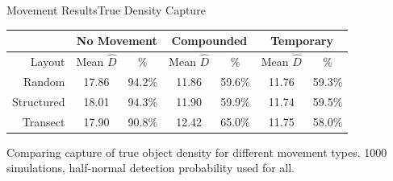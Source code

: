 \documentclass{beamer}
\begin{document}
\begin{frame}{Movement Results}{True Density Capture}

	\begin{table}
	
		\begin{tabular}{ r| c c| c c| c c|}
		
			& \multicolumn{2}{|c|}{No Movement}	& \multicolumn{2}{|c|}{Compounded}	& \multicolumn{2}{|c|}{Temporary}\\ 
	 \hline \hline
	
	 Layout		&\footnotesize Mean $\hat{D}$	&\footnotesize \%  &\footnotesize Mean $\hat{D}$ &\footnotesize \%  &\footnotesize Mean $\hat{D}$ &\footnotesize \% 	\\ \hline \hline
	 Random		& 17.86 			& 94.2\% 		& 11.86	& 59.6\%	& 11.76	& 59.3\% \\
	 Structured	& 18.01 			& 94.3\% 		& 11.90 & 59.9\% 	& 11.74 & 59.5\% \\
	 Transect	& 17.90 			& 90.8\% 		& 12.42 & 65.0\% 	& 11.75 & 58.0\% \\ \hline
	
		\end{tabular}
	
	\end{table}
	\small
	Comparing capture of true object density for different movement types. 1000 simulations, half-normal detection probability used for all.
\end{frame}
\end{document}
